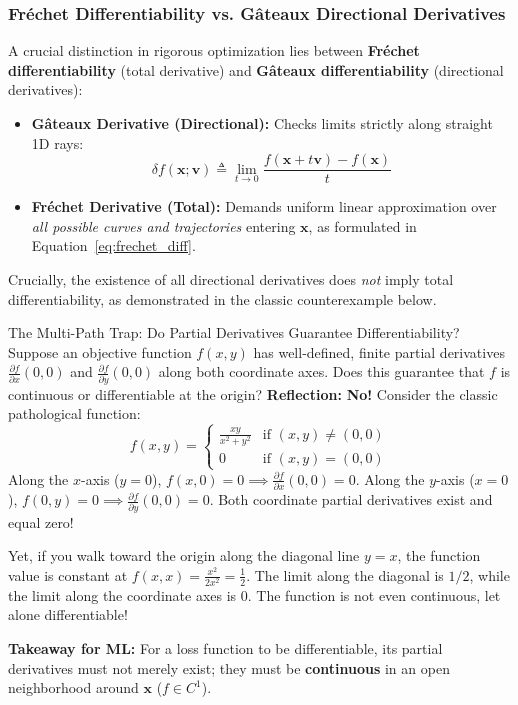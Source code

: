 \subsubsection{Fréchet Differentiability vs. Gâteaux Directional Derivatives}
A crucial distinction in rigorous optimization lies between \textbf{Fréchet differentiability} (total derivative) and \textbf{Gâteaux differentiability} (directional derivatives):
\begin{itemize}
    \item \textbf{Gâteaux Derivative (Directional):} Checks limits strictly along straight 1D rays:
    \begin{equation}
    \delta f(\mathbf{x}; \mathbf{v}) \triangleq \lim_{t \to 0} \frac{f(\mathbf{x} + t\mathbf{v}) - f(\mathbf{x})}{t}
    \end{equation}
    \item \textbf{Fréchet Derivative (Total):} Demands uniform linear approximation over \emph{all possible curves and trajectories} entering $\mathbf{x}$, as formulated in Equation~\eqref{eq:frechet_diff}.
\end{itemize}
Crucially, the existence of all directional derivatives does \emph{not} imply total differentiability, as demonstrated in the classic counterexample below.

\begin{ponderbox}{The Multi-Path Trap: Do Partial Derivatives Guarantee Differentiability?}
Suppose an objective function $f(x, y)$ has well-defined, finite partial derivatives $\frac{\partial f}{\partial x}(0, 0)$ and $\frac{\partial f}{\partial y}(0, 0)$ along both coordinate axes. Does this guarantee that $f$ is continuous or differentiable at the origin?
\tcblower
\textbf{Reflection:} \textbf{No!} Consider the classic pathological function:
\begin{equation*}
f(x, y) = \begin{cases} \frac{xy}{x^2 + y^2} & \text{if } (x, y) \ne (0, 0) \\ 0 & \text{if } (x, y) = (0, 0) \end{cases}
\end{equation*}
Along the $x$-axis ($y = 0$), $f(x, 0) = 0 \implies \frac{\partial f}{\partial x}(0, 0) = 0$. Along the $y$-axis ($x = 0$), $f(0, y) = 0 \implies \frac{\partial f}{\partial y}(0, 0) = 0$. Both coordinate partial derivatives exist and equal zero!

Yet, if you walk toward the origin along the diagonal line $y = x$, the function value is constant at $f(x, x) = \frac{x^2}{2x^2} = \frac{1}{2}$. The limit along the diagonal is $1/2$, while the limit along the coordinate axes is $0$. The function is not even continuous, let alone differentiable!

\textbf{Takeaway for ML:} For a loss function to be differentiable, its partial derivatives must not merely exist; they must be \textbf{continuous} in an open neighborhood around $\mathbf{x}$ ($f \in C^1$).
\end{ponderbox}

